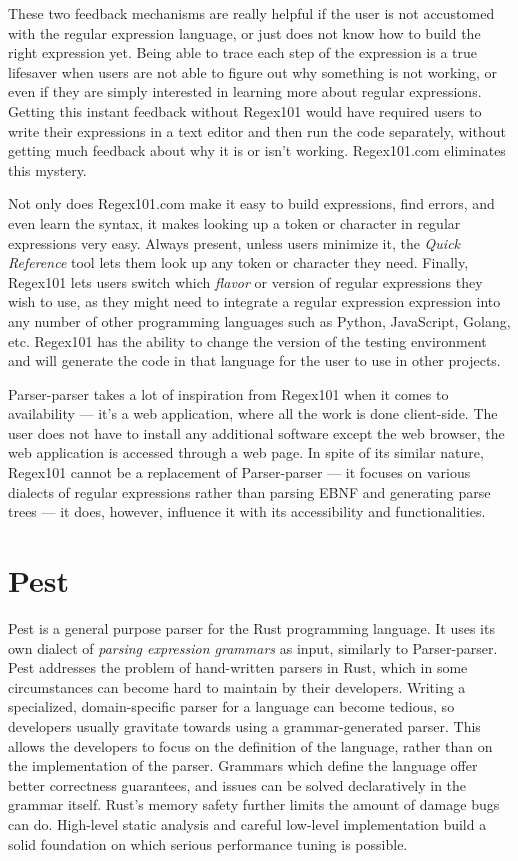 \documentclass[english,engineering]{wizthesis}
\newcommand{\paraphrase}[1]{#1}
\newcommand{\thisproject}{Parser-parser}
\begin{document}
{These two feedback mechanisms are really helpful if the user is not accustomed
with the regular expression language, or just does not know how to build the
right expression yet. Being able to trace each step of the expression is a true
lifesaver when users are not able to figure out why something is not working, or
even if they are simply interested in learning more about regular expressions.
Getting this instant feedback without Regex101 would have required users to
write their expressions in a text editor and then run the code separately,
without getting much feedback about why it is or isn't working. Regex101.com
eliminates this mystery.

Not only does Regex101.com make it easy to build expressions, find errors, and
even learn the syntax, it makes looking up a token or character in regular
expressions very easy. Always present, unless users minimize it, the \emph{Quick
Reference} tool lets them look up any token or character they need. Finally,
Regex101 lets users switch which \emph{flavor} or version of regular expressions
they wish to use, as they might need to integrate a regular expression
expression into any number of other programming languages such as Python,
JavaScript, Golang, etc. Regex101 has the ability to change the version of the
testing environment and will generate the code in that language for the user to
use in other projects.}

\thisproject{} takes a lot of inspiration from Regex101 when it comes to
availability --- it's a web application, where all the work is done client-side.
The user does not have to install any additional software except the web
browser, the web application is accessed through a web page. In spite of its
similar nature, Regex101 cannot be a replacement of \thisproject{} --- it
focuses on various dialects of regular expressions rather than parsing EBNF and
generating parse trees --- it does, however, influence it with its accessibility
and functionalities.

\section*{Pest}

Pest \cite{pest} is a general purpose parser for the Rust programming language.
It uses its own dialect of \emph{parsing expression grammars} as input,
similarly to \thisproject{}. Pest addresses the problem of hand-written parsers
in Rust, which in some circumstances can become hard to maintain by their
developers. Writing a specialized, domain-specific parser for a language can
become tedious, so developers usually gravitate towards using a
grammar-generated parser. This allows the developers to focus on the definition
of the language, rather than on the implementation of the parser.
\paraphrase{Grammars which define the language offer better correctness
guarantees, and issues can be solved declaratively in the grammar itself. Rust's
memory safety further limits the amount of damage bugs can do. High-level static
analysis and careful low-level implementation build a solid foundation on which
serious performance tuning is possible.}
\end{document}
